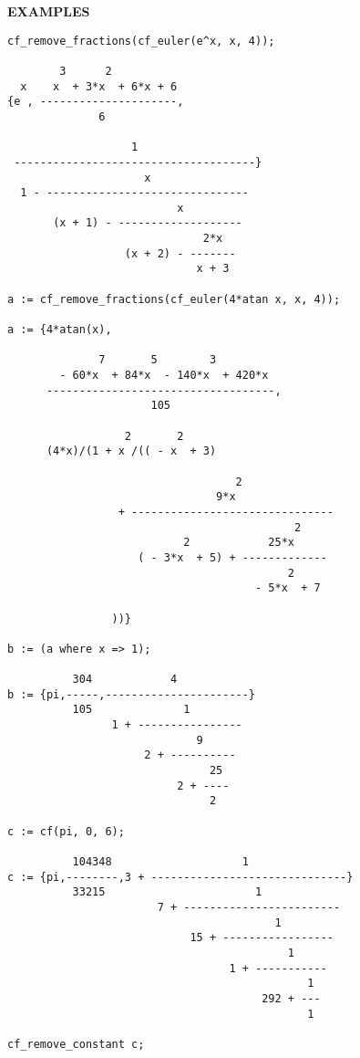 {\large\textbf{EXAMPLES}}
\begin{verbatim}
cf_remove_fractions(cf_euler(e^x, x, 4));

        3      2
  x    x  + 3*x  + 6*x + 6
{e , ---------------------,
              6

                   1
 -------------------------------------}
                     x
  1 - -------------------------------
                          x
       (x + 1) - -------------------
                              2*x
                  (x + 2) - -------
                             x + 3

a := cf_remove_fractions(cf_euler(4*atan x, x, 4));

a := {4*atan(x),

              7       5        3
        - 60*x  + 84*x  - 140*x  + 420*x
      -----------------------------------,
                      105

                  2       2
      (4*x)/(1 + x /(( - x  + 3)

                                   2
                                9*x
                 + -------------------------------
                                            2
                           2            25*x
                    ( - 3*x  + 5) + -------------
                                           2
                                      - 5*x  + 7

                ))}

b := (a where x => 1);

          304            4
b := {pi,-----,----------------------}
          105              1
                1 + ----------------
                             9
                     2 + ----------
                               25
                          2 + ----
                               2

c := cf(pi, 0, 6);

          104348                    1
c := {pi,--------,3 + ------------------------------}
          33215                       1
                       7 + ------------------------
                                         1
                            15 + -----------------
                                           1
                                  1 + -----------
                                              1
                                       292 + ---
                                              1

cf_remove_constant c;


\end{verbatim}
